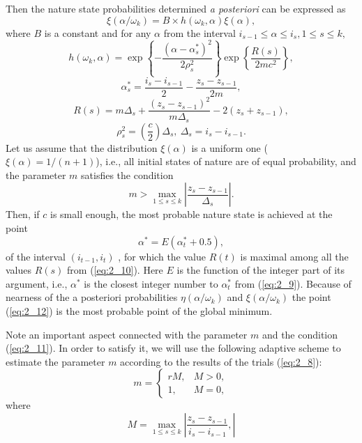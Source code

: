 Then the nature state probabilities determined \textit{a posteriori} can be expressed as 
\begin{displaymath}
\xi(\alpha/\omega_k)=B\times h(\omega_k,\alpha)\xi(\alpha),
\end{displaymath}
where $B$ is a constant and for any $\alpha$ from the interval  $i_{s-1}\leq\alpha\leq i_s,1\leq s\leq k,$
\begin{displaymath}
h(\omega_k,\alpha)=\exp\left\{-\frac{(\alpha-\alpha_s^*)^2}{2\rho_s^2}\right\}\exp\left\{\frac{R(s)}{2mc^2}\right\},
\end{displaymath}
\begin{equation}
\label{eq:2_9}
\alpha_s^*=\frac{i_s-i_{s-1}}{2}-\frac{z_s-z_{s-1}}{2m},
\end{equation}
\begin{equation}
\label{eq:2_10}
R(s)=m\Delta_s+\frac{(z_s-z_{s-1})^2}{m\Delta_s}-2(z_s+z_{s-1}),
\end{equation}
\begin{displaymath}
\rho_s^2=\left(\frac{c}{2}\right)\Delta_s,\ \Delta_s=i_s-i_{s-1}.
\end{displaymath}
Let us assume that the distribution  $\xi(\alpha)$ is a uniform one ($\xi(\alpha)=1/(n+1)$), i.e., all initial states of nature are of equal probability, and the parameter $m$ satisfies the condition
\begin{equation}
\label{eq:2_11}
m>\max_{1\leq s\leq k}\left|\frac{z_s-z_{s-1}}{\Delta_s}\right|.
\end{equation}
Then, if $c$ is small enough, the most probable nature state is achieved at the point
\begin{equation}
\label{eq:2_12}
\alpha^*=E(\alpha_t^*+0.5),
\end{equation}
of the interval $(i_{t-1},i_t)$ , for which the value $R(t)$  is maximal among all  the values $R(s)$  from (\ref{eq:2_10}). Here $E$ is the function of the integer part of its argument, i.e., $\alpha^*$  is the closest integer number to $\alpha_t^*$  from (\ref{eq:2_9}). Because of nearness of the a posteriori probabilities $\eta(\alpha/\omega_k)$  and  $\xi(\alpha/\omega_k)$ the point (\ref{eq:2_12}) is the most probable point of the global minimum. 

Note an important aspect connected with the parameter $m$ and the condition (\ref{eq:2_11}). In order to satisfy it, we will use the following adaptive scheme to estimate the parameter $m$ according to the results of the trials (\ref{eq:2_8}):
\begin{equation}
\label{eq:2_13}
m =\begin{cases}
    rM, & M>0, \\
    1, & M=0,
  \end{cases} 
\end{equation}
where
\begin{equation}
\label{eq:2_14}
M=\max_{1\leq s\leq k}\left|\frac{z_s-z_{s-1}}{i_s-i_{s-1}},\right| 
\end{equation}

